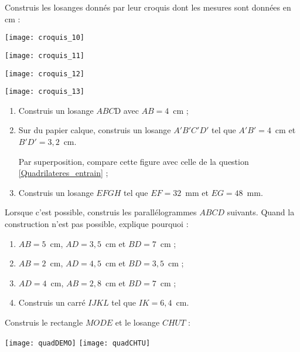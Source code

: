 \begin{exercice}
Construis les losanges donnés par leur croquis dont les mesures sont données en cm :
\begin{colenumerate}{2}
 \item
 
 \texttt{[image: croquis\_10]}
  \item
 
 \texttt{[image: croquis\_11]}
  \item
 
 \texttt{[image: croquis\_12]}
  \item
 
 \texttt{[image: croquis\_13]}
 \end{colenumerate}
\end{exercice}


\begin{exercice}[Losanges]
\begin{enumerate}
 \item Construis un losange $ABC$D avec $AB = 4$ cm ; \label{Quadrilateres_entrain}
 \item Sur du papier calque, construis un losange $A'B'C'D'$ tel que $A'B' = 4$ cm et $B'D' = 3,2$ cm.
 
Par superposition, compare cette figure avec celle de la question \ref{Quadrilateres_entrain} ;
 \item Construis un losange $EFGH$ tel que $EF = 32$ mm et $EG = 48$ mm.
 \end{enumerate}
\end{exercice}


\begin{exercice}
Lorsque c'est possible, construis les parallélogrammes $ABCD$ suivants. Quand la construction n'est pas possible, explique pourquoi :
\begin{enumerate}
 \item $AB = 5$ cm, $AD = 3,5$ cm et $BD = 7$ cm ;
 \item $AB = 2$ cm, $AD = 4,5$ cm et $BD= 3,5$ cm ;
 \item $AD = 4$ cm, $AB = 2,8$ cm et $BD = 7$ cm ;
 \item Construis un carré $IJKL$ tel que $IK = 6,4$ cm.
 \end{enumerate}
\end{exercice}


\begin{exercice}[Constructions]
Construis le rectangle $MODE$ et le losange $CHUT$ :

\qquad \texttt{[image: quadDEMO]} \qquad \texttt{[image: quadCHTU]}
\end{exercice}


